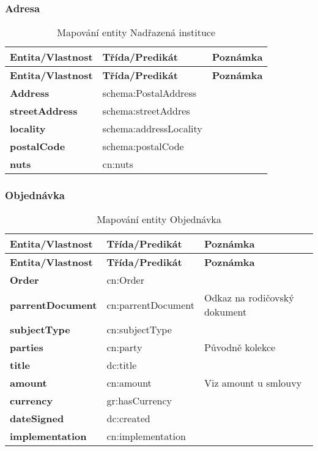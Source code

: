 \newpage

\subsubsection*{Adresa}

\begin{center}
\begin{longtable}{lp{30mm}p{65mm}}
\label{grid_mlmmh} \\
\multicolumn{1}{l}{\textbf{Entita/Vlastnost}} & 
\multicolumn{1}{l}{\textbf{Třída/Predikát}} & 
\multicolumn{1}{l}{\textbf{Poznámka}} \\ \hline 
\endfirsthead
\multicolumn{1}{l}{\textbf{Entita/Vlastnost}} & 
\multicolumn{1}{l}{\textbf{Třída/Predikát}} & 
\multicolumn{1}{l}{\textbf{Poznámka}} \\ \hline 
\hline
\endhead
\endfoot
\caption{Mapování entity Nadřazená instituce}
\endlastfoot
\textbf{Address} & schema:PostalAddress & \\
\textbf{streetAddress} & schema:streetAddres \\
\textbf{locality} & schema:addressLocality \\
\textbf{postalCode} & schema:postalCode \\
\textbf{nuts} & cn:nuts \\
\end{longtable}
\end{center}

\subsubsection*{Objednávka}

\begin{center}
\begin{longtable}{lp{30mm}p{65mm}}
\label{grid_mlmmh} \\
\multicolumn{1}{l}{\textbf{Entita/Vlastnost}} & 
\multicolumn{1}{l}{\textbf{Třída/Predikát}} & 
\multicolumn{1}{l}{\textbf{Poznámka}} \\ \hline 
\endfirsthead
\multicolumn{1}{l}{\textbf{Entita/Vlastnost}} & 
\multicolumn{1}{l}{\textbf{Třída/Predikát}} & 
\multicolumn{1}{l}{\textbf{Poznámka}} \\ \hline 
\hline
\endhead
\endfoot
\caption{Mapování entity Objednávka}
\endlastfoot
\textbf{Order} & cn:Order \\
\textbf{parrentDocument} & cn:parrentDocument & Odkaz na rodičovský dokument \\
\textbf{subjectType} & cn:subjectType \\
\textbf{parties} & cn:party & Původně kolekce \\
\textbf{title} & dc:title \\
\textbf{amount} & cn:amount & Viz amount u smlouvy \\
\textbf{currency} & gr:hasCurrency \\
\textbf{dateSigned} & dc:created \\
\textbf{implementation} & cn:implementation \\
\end{longtable}
\end{center}

